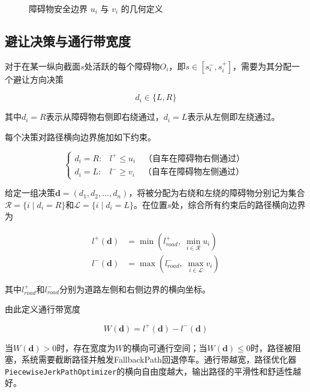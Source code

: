 \begin{figure}[htbp]
\centering
{}
\caption{障碍物安全边界 $u_i$ 与 $v_i$ 的几何定义}
\label{fig:obstacle_uvi}
\end{figure}

\subsection{避让决策与通行带宽度}
对于在某一纵向截面$s$处活跃的每个障碍物$O_i$，即$s \in [s_i^{-}, s_i^{+}]$，需要为其分配一个避让方向决策

\begin{equation}
    d_i \in \{L, R\}
    \label{eq:decision_var}
\end{equation}

其中$d_i = R$表示从障碍物右侧即右绕通过，$d_i = L$表示从左侧即左绕通过。

每个决策对路径横向边界施加如下约束。

\begin{equation}
\begin{cases}
d_i = R \colon & l^{+} \leq u_i \quad \text{（自车在障碍物右侧通过）} \\
d_i = L \colon & l^{-} \geq v_i \quad \text{（自车在障碍物左侧通过）}
\end{cases}
\end{equation}

给定一组决策$\mathbf{d} = (d_1, d_2, \ldots, d_n)$，将被分配为右绕和左绕的障碍物分别记为集合$\mathcal{R} = \{i \mid d_i = R\}$和$\mathcal{L} = \{i \mid d_i = L\}$。在位置$s$处，综合所有约束后的路径横向边界为

\begin{align}
    l^{+}(\mathbf{d}) &= \min\left(l_{road}^{+},\; \min_{i \in \mathcal{R}} u_i\right) \label{eq:upper_bound} \\
    l^{-}(\mathbf{d}) &= \max\left(l_{road}^{-},\; \max_{i \in \mathcal{L}} v_i\right) \label{eq:lower_bound}
\end{align}

其中$l_{road}^{+}$和$l_{road}^{-}$分别为道路左侧和右侧边界的横向坐标。

由此定义通行带宽度

\begin{equation}
    W(\mathbf{d}) = l^{+}(\mathbf{d}) - l^{-}(\mathbf{d})
    \label{eq:band_width}
\end{equation}

当$W(\mathbf{d}) > 0$时，存在宽度为$W$的横向可通行空间；当$W(\mathbf{d}) \leq 0$时，路径被阻塞，系统需要截断路径并触发FallbackPath回退停车。通行带越宽，路径优化器\texttt{PiecewiseJerkPathOptimizer}的横向自由度越大，输出路径的平滑性和舒适性越好。

